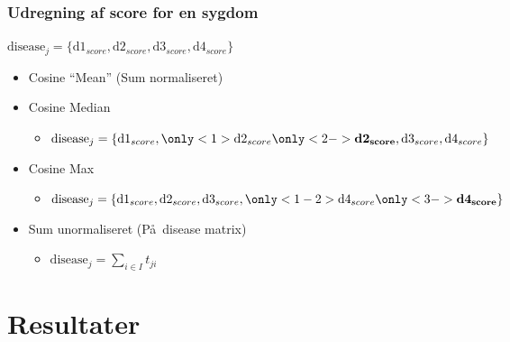 \documentclass[xcolor=table]{beamer}
\begin{document}
\begin{frame}

  \frametitle{Udregning af score for en sygdom}
  
  $\textrm{disease}_j = \{\textrm{d1}_{score}, \textrm{d2}_{score},
  \textrm{d3}_{score}, \textrm{d4}_{score} \}$

  \begin{itemize}
    \item Cosine ``Mean'' (Sum normaliseret)
      \begin{itemize}
      \end{itemize}
    \item Cosine Median
      \begin{itemize}
        \item $ \textrm{disease}_j =
        \{\textrm{d1}_{score}, \only<1>{\textrm{d2}_{score}}
        \only<2->{\textbf{d2}_{\mathbf{score}}}, \textrm{d3}_{score},
        \textrm{d4}_{score} \}$
      \end{itemize}
    \item Cosine Max
      \begin{itemize}
        \item $ \textrm{disease}_j =
        \{\textrm{d1}_{score}, \textrm{d2}_{score},
        \textrm{d3}_{score}, \only<1-2>{\textrm{d4}_{score}}
        \only<3->{\textbf{d4}_{\mathbf{score}}} \}$
      \end{itemize}
    \item Sum unormaliseret (P\aa\ disease matrix)
      \begin{itemize}
        \item $\textrm{disease}_j = \sum_{i \in I} t_{ji}$
      \end{itemize}
  \end{itemize}

\end{frame}

\section{Resultater}

\subsection*{}
\end{document}
